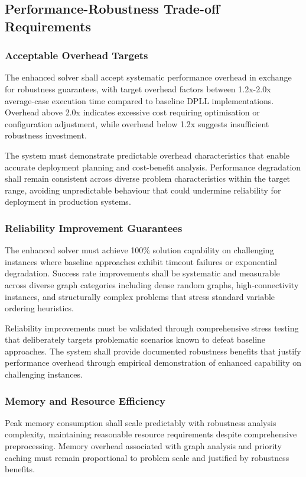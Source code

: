 \subsection{Performance-Robustness Trade-off Requirements}

\subsubsection{Acceptable Overhead Targets}
The enhanced solver shall accept systematic performance overhead in exchange for robustness guarantees, with target overhead factors between 1.2x-2.0x average-case execution time compared to baseline DPLL implementations. Overhead above 2.0x indicates excessive cost requiring optimisation or configuration adjustment, while overhead below 1.2x suggests insufficient robustness investment.

The system must demonstrate predictable overhead characteristics that enable accurate deployment planning and cost-benefit analysis. Performance degradation shall remain consistent across diverse problem characteristics within the target range, avoiding unpredictable behaviour that could undermine reliability for deployment in production systems.

\subsubsection{Reliability Improvement Guarantees}
The enhanced solver must achieve 100\% solution capability on challenging instances where baseline approaches exhibit timeout failures or exponential degradation. Success rate improvements shall be systematic and measurable across diverse graph categories including dense random graphs, high-connectivity instances, and structurally complex problems that stress standard variable ordering heuristics.

Reliability improvements must be validated through comprehensive stress testing that deliberately targets problematic scenarios known to defeat baseline approaches. The system shall provide documented robustness benefits that justify performance overhead through empirical demonstration of enhanced capability on challenging instances.

\subsubsection{Memory and Resource Efficiency}
Peak memory consumption shall scale predictably with robustness analysis complexity, maintaining reasonable resource requirements despite comprehensive preprocessing. Memory overhead associated with graph analysis and priority caching must remain proportional to problem scale and justified by robustness benefits.

